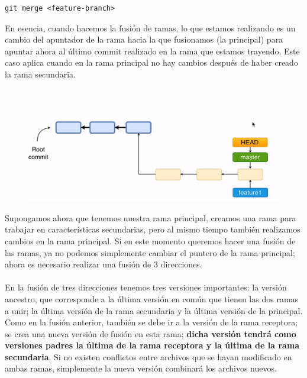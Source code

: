 \begin{verbatim}
git merge <feature-branch>
\end{verbatim}
En esencia, cuando hacemos la fusión de ramas, lo que estamos realizando es un cambio del apuntador de la rama hacia la que fusionamos (la principal) para apuntar ahora al último commit realizado en la rama que estamos trayendo. Este caso aplica cuando en la rama principal no hay cambios después de haber creado la rama secundaria.\\\\
\begin{figure}[H]
    \centering
    \includegraphics[scale=0.5]{Github/Git_f7.png}
\end{figure}
Supongamos ahora que tenemos nuestra rama principal, creamos una rama para trabajar en características secundarias, pero al mismo tiempo también realizamos cambios en la rama principal. Si en este momento queremos hacer una fusión de las ramas, ya no podemos simplemente cambiar el puntero de la rama principal; ahora es necesario realizar una fusión de 3 direcciones. \\\\
En la fusión de tres direcciones tenemos tres versiones importantes: la versión ancestro, que corresponde a la última versión en común que tienen las dos ramas a unir; la última versión de la rama secundaria y la última versión de la principal.
Como en la fusión anterior, también se debe ir a la versión de la rama receptora; se crea una nueva versión de fusión en esta rama; \textbf{dicha versión tendrá como versiones padres la última de la rama receptora y la última de la rama secundaria}. Si no existen conflictos entre archivos que se hayan modificado en ambas ramas, simplemente la nueva versión combinará los archivos nuevos.\\\\

